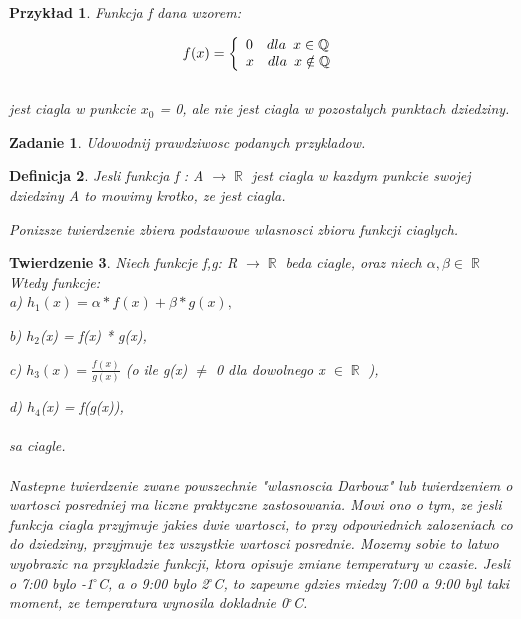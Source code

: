 \documentclass[11pt,a4paper]{article}
\newtheorem{tw}{Twierdzenie}[section]
\newtheorem{df}[tw]{Definicja}
\newtheorem{ex}[tw]{Przykład}
\newtheorem{zad}{Zadanie}
\DeclareMathOperator{\R}{\mathbb{R}}
\DeclareMathOperator{\Q}{\mathbb{Q}}
\begin{document}
\begin{ex} Funkcja f dana wzorem:

\[f(x) = \left\{ \begin{array}{l} 0 \hspace{10bp} dla \hspace{5bp} x \in \Q \\ x \hspace{10bp} dla \hspace{5bp} x
\notin \Q \end{array} \right. \]
\\
jest ciagla w punkcie $x_{0}$ = 0, ale nie jest ciagla w pozostalych punktach dziedziny.
\end{ex}

\begin{zad}
Udowodnij prawdziwosc podanych przykladow.
\end{zad} 

\begin{df}
Jesli funkcja f : A $\rightarrow \R$ jest ciagla w kazdym punkcie swojej dziedziny A to mowimy krotko, ze jest 
ciagla.
\begin{center}
Ponizsze twierdzenie zbiera podstawowe wlasnosci zbioru funkcji ciaglych.
\end{center}
\end{df}

\begin{tw}
Niech funkcje f,g: R $\rightarrow \R$ beda ciagle, oraz niech $\alpha,\beta \in \R$
Wtedy funkcje:
\\

a) $h_{1}(x) = \alpha * f(x) + \beta * g(x),$

b) $h_{2}$(x) = f(x) * g(x),

c) $h_{3}(x) = \frac{f(x)}{g(x)}$ (o ile g(x) $\not=$ 0 dla dowolnego x $\in \R$ ),

d) $h_{4}$(x) = f(g(x)), 
\\
\\
sa ciagle.
\\
\\
\indent
Nastepne twierdzenie zwane powszechnie "wlasnoscia Darboux" lub twierdzeniem
o wartosci posredniej ma liczne praktyczne zastosowania. Mowi ono o tym,
ze jesli funkcja ciagla przyjmuje jakies dwie wartosci, to przy odpowiednich zalozeniach
co do dziedziny, przyjmuje tez wszystkie wartosci posrednie. Mozemy sobie to
latwo wyobrazic na przykladzie funkcji, ktora opisuje zmiane temperatury w czasie.
Jesli o 7:00 bylo -1$^\circ$C, a o 9:00 bylo 2$^\circ$C, to zapewne gdzies miedzy 7:00 a 9:00 byl
taki moment, ze temperatura wynosila dokladnie 0$^\circ$C.
\end{tw}
\end{document}
